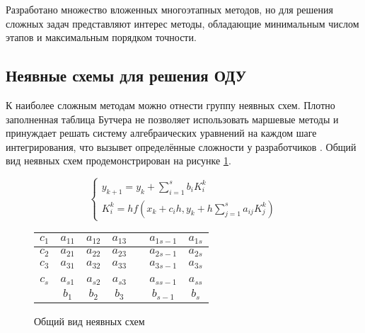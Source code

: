 Разработано множество вложенных многоэтапных методов, но для решения сложных задач представляют интерес методы, обладающие минимальным
числом этапов и максимальным порядком точности.

\subsection{Неявные схемы для решения ОДУ}

К наиболее сложным методам можно отнести группу неявных схем. Плотно заполненная таблица Бутчера не позволяет использовать маршевые
методы и принуждает решать систему алгебраических уравнений на каждом шаге интегрирования, что вызывет определённые сложности у
разработчиков \cite{book2, book6, cite_1_3, book5}. Общий вид неявных схем продемонстрирован на рисунке \ref{fig:Gauss}.

\begin{figure}
    \begin{minipage}[t]{8.5cm}
        {\small
        \begin{equation*}
            \begin{cases}
                y_{k + 1} = y_k + \sum\limits_{i = 1}^sb_iK_i^k\\
                K_i^k = hf(x_k + c_ih, y_k + h\sum\limits_{j = 1}^{s}a_{ij}K_j^k)
            \end{cases}
        \end{equation*}
        }
    \end{minipage}
    \begin{minipage}[t]{7.5cm}
        \begin{table}    
            \begin{tabular}{|c|c|c|c|c|c|c|}
            \hline
            $c_1$ & $a_{11}$ & $a_{12}$ & $a_{13}$ & & $a_{1s-1}$ & $a_{1s}$\\
            \hline
            $c_2$ & $a_{21}$ & $a_{22}$ & $a_{23}$ & & $a_{2s-1}$ & $a_{2s}$\\
            \hline
            $c_3$ & $a_{31}$ & $a_{32}$ & $a_{33}$ & & $a_{3s-1}$ & $a_{3s}$\\
            \hline
            & & & & & &\\
            \hline
            $c_s$ & $a_{s1}$ & $a_{s2}$ & $a_{s3}$ & & $a_{ss-1}$ & $a_{ss}$\\
            \hline
            & \cellcolor{lightgray} $b_1$ & \cellcolor{lightgray} $b_2$ & \cellcolor{lightgray} $b_3$ & \cellcolor{lightgray} & \cellcolor{lightgray} $b_{s-1}$ &  \cellcolor{lightgray} $b_s$\\
            \hline
            \end{tabular}
        \end{table}
    \end{minipage}
    \caption{Общий вид неявных схем}
    \label{fig:Gauss}
\end{figure}

